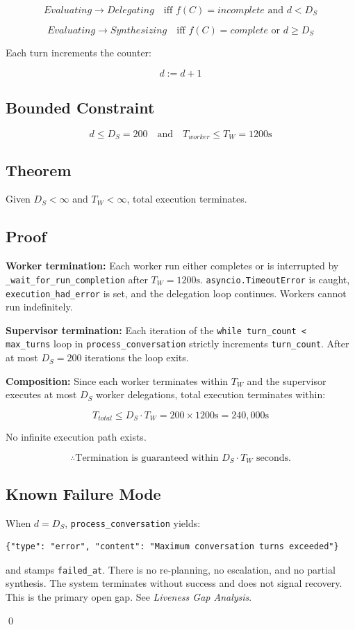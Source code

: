\[ Evaluating \rightarrow Delegating \quad \text{iff } f(C) = incomplete \text{ and } d < D_S \]

\[ Evaluating \rightarrow Synthesizing \quad \text{iff } f(C) = complete \text{ or } d \geq D_S \]

Each turn increments the counter:

\[ d := d + 1 \]

\subsection*{Bounded Constraint}

\[ d \leq D_S = 200 \quad \text{and} \quad T_{worker} \leq T_W = 1200\text{s} \]

\subsection*{Theorem}

Given $D_S < \infty$ and $T_W < \infty$, total execution terminates.

\subsection*{Proof}

\textbf{Worker termination:} Each worker run either completes or is interrupted by
\texttt{\_wait\_for\_run\_completion} after $T_W = 1200\text{s}$.
\texttt{asyncio.TimeoutError} is caught, \texttt{execution\_had\_error} is set,
and the delegation loop continues. Workers cannot run indefinitely.

\textbf{Supervisor termination:} Each iteration of the \texttt{while turn\_count < max\_turns}
loop in \texttt{process\_conversation} strictly increments \texttt{turn\_count}.
After at most $D_S = 200$ iterations the loop exits.

\textbf{Composition:} Since each worker terminates within $T_W$ and the supervisor
executes at most $D_S$ worker delegations, total execution terminates within:

\[ T_{total} \leq D_S \cdot T_W = 200 \times 1200\text{s} = 240{,}000\text{s} \]

No infinite execution path exists.

\[ \therefore \text{Termination is guaranteed within } D_S \cdot T_W \text{ seconds.} \]

\subsection*{Known Failure Mode}

When $d = D_S$, \texttt{process\_conversation} yields:

\begin{verbatim}
{"type": "error", "content": "Maximum conversation turns exceeded"}
\end{verbatim}

and stamps \texttt{failed\_at}. There is no re-planning, no escalation,
and no partial synthesis. The system terminates without success and does not
signal recovery. This is the primary open gap. See \textit{Liveness Gap Analysis}.

\qed
